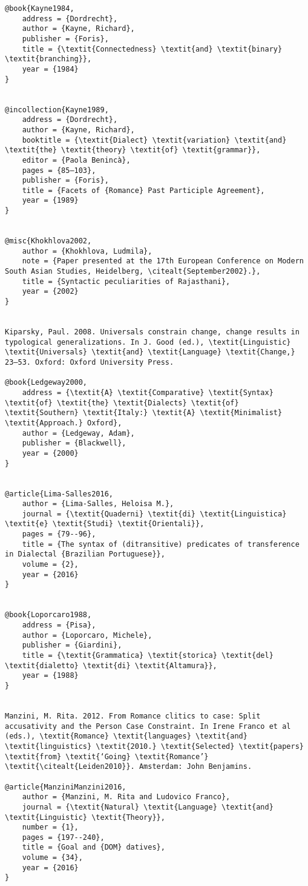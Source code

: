 \documentclass[output=paper]{langscibook}
\begin{document}
\begin{verbatim}
@book{Kayne1984,
	address = {Dordrecht},
	author = {Kayne, Richard},
	publisher = {Foris},
	title = {\textit{Connectedness} \textit{and} \textit{binary} \textit{branching}},
	year = {1984}
}


@incollection{Kayne1989,
	address = {Dordrecht},
	author = {Kayne, Richard},
	booktitle = {\textit{Dialect} \textit{variation} \textit{and} \textit{the} \textit{theory} \textit{of} \textit{grammar}},
	editor = {Paola Benincà},
	pages = {85–103},
	publisher = {Foris},
	title = {Facets of {Romance} Past Participle Agreement},
	year = {1989}
}


@misc{Khokhlova2002,
	author = {Khokhlova, Ludmila},
	note = {Paper presented at the 17th European Conference on Modern South Asian Studies, Heidelberg, \citealt{September2002}.},
	title = {Syntactic peculiarities of Rajasthani},
	year = {2002}
}


Kiparsky, Paul. 2008. Universals constrain change, change results in typological generalizations. In J. Good (ed.), \textit{Linguistic} \textit{Universals} \textit{and} \textit{Language} \textit{Change,} 23–53. Oxford: Oxford University Press.

@book{Ledgeway2000,
	address = {\textit{A} \textit{Comparative} \textit{Syntax} \textit{of} \textit{the} \textit{Dialects} \textit{of} \textit{Southern} \textit{Italy:} \textit{A} \textit{Minimalist} \textit{Approach.} Oxford},
	author = {Ledgeway, Adam},
	publisher = {Blackwell},
	year = {2000}
}


@article{Lima-Salles2016,
	author = {Lima-Salles, Heloisa M.},
	journal = {\textit{Quaderni} \textit{di} \textit{Linguistica} \textit{e} \textit{Studi} \textit{Orientali}},
	pages = {79--96},
	title = {The syntax of (ditransitive) predicates of transference in Dialectal {Brazilian Portuguese}},
	volume = {2},
	year = {2016}
}


@book{Loporcaro1988,
	address = {Pisa},
	author = {Loporcaro, Michele},
	publisher = {Giardini},
	title = {\textit{Grammatica} \textit{storica} \textit{del} \textit{dialetto} \textit{di} \textit{Altamura}},
	year = {1988}
}


Manzini, M. Rita. 2012. From Romance clitics to case: Split accusativity and the Person Case Constraint. In Irene Franco et al (eds.), \textit{Romance} \textit{languages} \textit{and} \textit{linguistics} \textit{2010.} \textit{Selected} \textit{papers} \textit{from} \textit{‘Going} \textit{Romance’} \textit{\citealt{Leiden2010}}. Amsterdam: John Benjamins.

@article{ManziniManzini2016,
	author = {Manzini, M. Rita and Ludovico Franco},
	journal = {\textit{Natural} \textit{Language} \textit{and} \textit{Linguistic} \textit{Theory}},
	number = {1},
	pages = {197--240},
	title = {Goal and {DOM} datives},
	volume = {34},
	year = {2016}
}



\end{verbatim}
\end{document}
